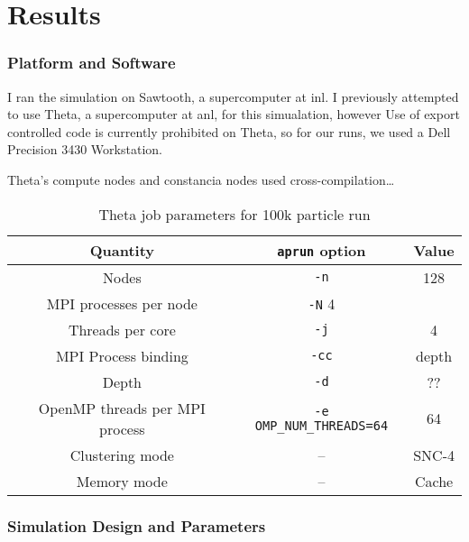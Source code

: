 \chapter{Results}
\label{ch:chapter5}

\subsection{Platform and Software}
\label{sub:platform-software}
I ran the \OpenMC simulation on Sawtooth, a supercomputer at \Gls{inl}.
I previously attempted to use Theta, a supercomputer at \Gls{anl}, for this
simualation, however \OpenMC
Use of export controlled code is currently prohibited on Theta, so for our \SerpentTWO runs,
we used a Dell Precision 3430 Workstation.

Theta's compute nodes and constancia nodes used cross-compilation\ldots

\begin{table}[htpb] 
    \centering 
    \caption{Theta job parameters for 100k particle \OpenMC run}
    \label{tab:theta-params}
    \begin{tabular}{|c|c|c|} 
        \hline
        Quantity & \verb.aprun. option & Value\\
        \hline
        Nodes & \verb.-n. & 128 \\
        \hline
        MPI processes per node & \verb.-N. 4 \\
        \hline
        Threads per core & \verb.-j. & 4 \\
        \hline
        MPI Process binding & \verb.-cc. & depth \\
        \hline
        Depth & \verb.-d. & ?? \\
        \hline
        OpenMP threads per MPI process & \verb.-e OMP_NUM_THREADS=64. & 64 \\
        \hline
        Clustering mode & -- & SNC-4 \\
        \hline
        Memory mode & -- & Cache \\
        \hline
    \end{tabular}
\end{table}

\subsection{Simulation Design and Parameters}
\label{sub:simulation-parameters}

